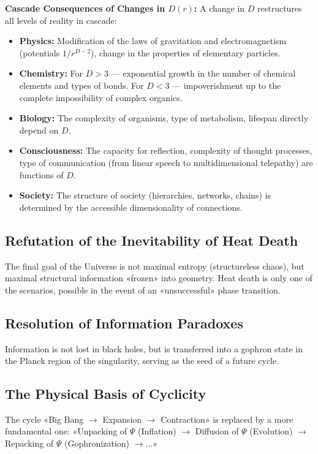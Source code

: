 \documentclass[a4paper,12pt]{article}
\begin{document}
	\textbf{Cascade Consequences of Changes in $D(r)$:} A change in $D$ restructures all levels of reality in cascade:
	\begin{itemize}
		\item \textbf{Physics:} Modification of the laws of gravitation and electromagnetism (potentials $1/r^{D-2}$), change in the properties of elementary particles.
		\item \textbf{Chemistry:} For $D > 3$ — exponential growth in the number of chemical elements and types of bonds. For $D < 3$ — impoverishment up to the complete impossibility of complex organics.
		\item \textbf{Biology:} The complexity of organisms, type of metabolism, lifespan directly depend on $D$.
		\item \textbf{Consciousness:} The capacity for reflection, complexity of thought processes, type of communication (from linear speech to multidimensional telepathy) are functions of $D$.
		\item \textbf{Society:} The structure of society (hierarchies, networks, chains) is determined by the accessible dimensionality of connections.
	\end{itemize}
	
	\subsection{Refutation of the Inevitability of Heat Death}
	
	The final goal of the Universe is not maximal entropy (structureless chaos), but maximal structural information «frozen» into geometry. Heat death is only one of the scenarios, possible in the event of an «unsuccessful» phase transition.
	
	\subsection{Resolution of Information Paradoxes}
	
	Information is not lost in black holes, but is transferred into a gophron state in the Planck region of the singularity, serving as the seed of a future cycle.
	
	\subsection{The Physical Basis of Cyclicity}
	
	The cycle «Big Bang $\to$ Expansion $\to$ Contraction» is replaced by a more fundamental one: «Unpacking of $\Psi$ (Inflation) $\to$ Diffusion of $\Psi$ (Evolution) $\to$ Repacking of $\Psi$ (Gophronization) $\to \dots$»
	
\end{document}
